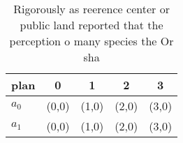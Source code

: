 \documentclass[a4paper]{article}
\begin{document}
\begin{table}
\begin{adjustbox}{width=0.5\columnwidth}
\begin{tabular}{|l|l|l|l|l|}
\hline
\textbf{plan} & \multicolumn{1}{c|}{\textbf{0}} & \multicolumn{1}{c|}{\textbf{1}} & \multicolumn{1}{c|}{\textbf{2}} & \multicolumn{1}{c|}{\textbf{3}} \\ \hline
\textbf{$a_0$}  & (0,0) & (1,0) & (2,0) & (3,0) \\ \hline
\textbf{$a_1$}  & (0,0) & (1,0) & (2,0) & (3,0) \\ \hline
\end{tabular}
\end{adjustbox}
\caption{Rigorously as reerence center or public land reported that the perception o many species the Or sha
}
\end{table}
\end{document}
